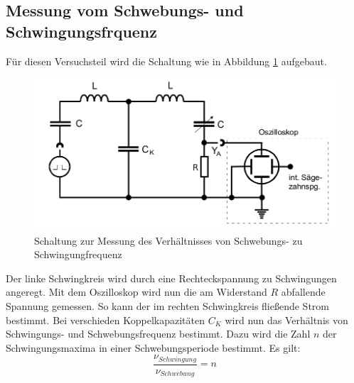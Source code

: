 \documentclass[11pt,ngerman,a4paper]{article}
\begin{document}
\subsection{Messung vom Schwebungs- und Schwingungsfrquenz}
Für diesen Versuchsteil wird die Schaltung wie in Abbildung \ref{abb2} aufgebaut.
\begin{figure}[h!]
\centering
\includegraphics[scale=0.5]{Abb/abb2.png}
\caption{Schaltung zur Messung des Verhältnisses von Schwebungs- zu Schwingungfrequenz }
\label{abb2}
\end{figure}
 Der linke Schwingkreis wird durch eine Rechteckspannung zu Schwingungen angeregt. Mit dem Oszilloskop wird nun die am Widerstand $R$ abfallende Spannung gemessen. So kann der im rechten Schwingkreis fließende Strom bestimmt. Bei verschieden Koppelkapazitäten $C_K$ wird nun das Verhältnis von Schwingungs- und Schwebungsfrequenz bestimmt. Dazu wird die Zahl $n$ der Schwingungsmaxima in einer Schwebungsperiode bestimmt. Es gilt:
\begin{equation}
\frac{\nu_{Schwingung}}{\nu_{Schwebung}} = n
\end{equation}
\end{document}
